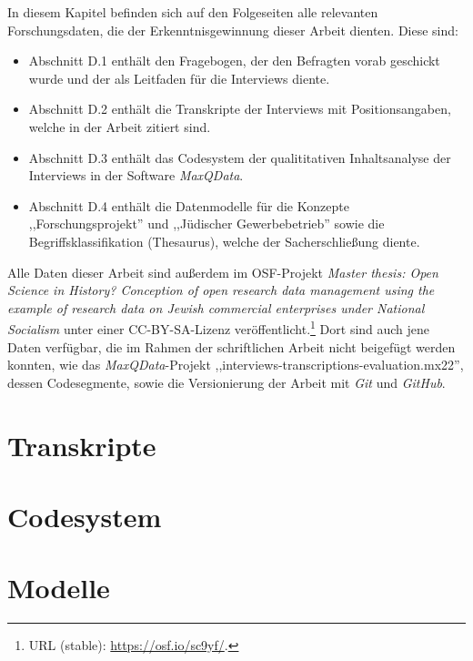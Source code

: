 
In diesem Kapitel befinden sich auf den Folgeseiten alle relevanten Forschungsdaten, die der Erkenntnisgewinnung dieser Arbeit dienten. Diese sind:

\begin{itemize}
  \item Abschnitt D.1 enthält den Fragebogen, der den Befragten vorab geschickt wurde und der als Leitfaden für die Interviews diente.
  \item Abschnitt D.2 enthält die Transkripte der Interviews mit Positionsangaben, welche in der Arbeit zitiert sind.
  \item Abschnitt D.3 enthält das Codesystem der qualititativen Inhaltsanalyse der Interviews in der Software \textit{MaxQData}.
  \item Abschnitt D.4 enthält die Datenmodelle für die Konzepte ,,Forschungsprojekt'' und ,,Jüdischer Gewerbebetrieb'' sowie die Begriffsklassifikation (Thesaurus), welche der Sacherschließung diente.
\end{itemize} 

Alle Daten dieser Arbeit sind außerdem im OSF-Projekt \textit{Master thesis: Open Science in History? Conception of open research data management using the example of research data on Jewish commercial enterprises under National Socialism} unter einer CC-BY-SA-Lizenz veröffentlicht.\footnote{URL (stable): \url{https://osf.io/sc9yf/}.} Dort sind auch jene Daten verfügbar, die im Rahmen der schriftlichen Arbeit nicht beigefügt werden konnten, wie das \textit{MaxQData}-Projekt ,,interviews-transcriptions-evaluation.mx22'', dessen Codesegmente, sowie die Versionierung der Arbeit mit \textit{Git} und \textit{GitHub}.








\section{Transkripte}
\section{Codesystem}
\section{Modelle}
